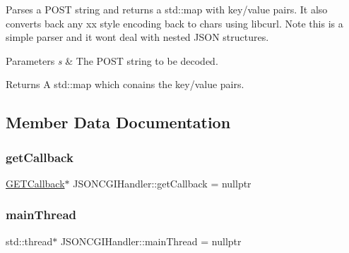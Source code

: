 Parses a P\+O\+ST string and returns a std\+::map with key/value pairs. It also converts back any xx style encoding back to chars using libcurl. Note this is a simple parser and it won\textquotesingle{}t deal with nested J\+S\+ON structures. 
\begin{DoxyParams}{Parameters}
{\em s} & The P\+O\+ST string to be decoded. \\
\hline
\end{DoxyParams}
\begin{DoxyReturn}{Returns}
A std\+::map which conains the key/value pairs. 
\end{DoxyReturn}


\subsection{Member Data Documentation}
\mbox{\label{classJSONCGIHandler_a7c8b4a44e15ac57fe93b382e86899fa7}} 
\subsubsection{\texorpdfstring{get\+Callback}{getCallback}}
{\footnotesize\ttfamily \hyperlink{classJSONCGIHandler_1_1GETCallback}{G\+E\+T\+Callback}$\ast$ J\+S\+O\+N\+C\+G\+I\+Handler\+::get\+Callback = nullptr\hspace{0.3cm}{\ttfamily [private]}}

\mbox{\label{classJSONCGIHandler_aca513f708ae4dc76ba70196ff25da695}} 
\subsubsection{\texorpdfstring{main\+Thread}{mainThread}}
{\footnotesize\ttfamily std\+::thread$\ast$ J\+S\+O\+N\+C\+G\+I\+Handler\+::main\+Thread = nullptr\hspace{0.3cm}{\ttfamily [private]}}

\mbox{\label{classJSONCGIHandler_a09ee0f555db808d07c9ee9a575780553}} 
